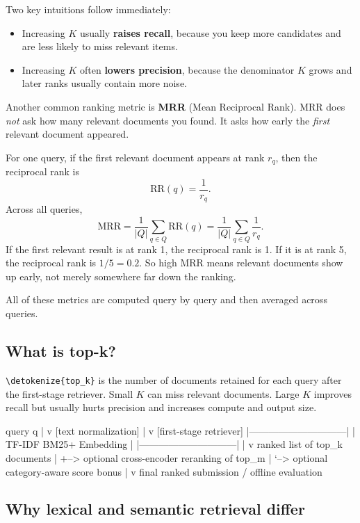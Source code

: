 \documentclass[10pt]{article}
\DeclareRobustCommand{\code}[1]{%
  \ifmmode
    \text{\nolinkurl{\detokenize{#1}}}%
  \else
    \nolinkurl{\detokenize{#1}}%
  \fi
}
\begin{document}
Two key intuitions follow immediately:
\begin{itemize}
    \item Increasing \(K\) usually \textbf{raises recall}, because you keep more candidates and are less likely to miss relevant items.
    \item Increasing \(K\) often \textbf{lowers precision}, because the denominator \(K\) grows and later ranks usually contain more noise.
\end{itemize}

Another common ranking metric is \textbf{MRR} (Mean Reciprocal Rank). MRR does \emph{not} ask how many relevant documents you found. It asks how early the \emph{first} relevant document appeared.

For one query, if the first relevant document appears at rank \(r_q\), then the reciprocal rank is
\[
\mathrm{RR}(q) = \frac{1}{r_q}.
\]
Across all queries,
\[
\mathrm{MRR} = \frac{1}{|Q|}\sum_{q \in Q} \mathrm{RR}(q)
= \frac{1}{|Q|}\sum_{q \in Q} \frac{1}{r_q}.
\]
If the first relevant result is at rank 1, the reciprocal rank is 1. If it is at rank 5, the reciprocal rank is \(1/5=0.2\). So high MRR means relevant documents show up early, not merely somewhere far down the ranking.

All of these metrics are computed query by query and then averaged across queries.

\subsection{What is top-k?}

\code{top_k} is the number of documents retained for each query after the first-stage retriever. Small \(K\) can miss relevant documents. Large \(K\) improves recall but usually hurts precision and increases compute and output size.

\begin{asciibox}[title={One-query view of the pipeline}]
query q
  |
  v
[text normalization]
  |
  v
[first-stage retriever]
  |------------------------------|
  | TF-IDF     BM25+   Embedding |
  |------------------------------|
  |
  v
ranked list of top_k documents
  |
  +--> optional cross-encoder reranking of top_m
  |
  `--> optional category-aware score bonus
  |
  v
final ranked submission / offline evaluation
\end{asciibox}

\subsection{Why lexical and semantic retrieval differ}
\end{document}
